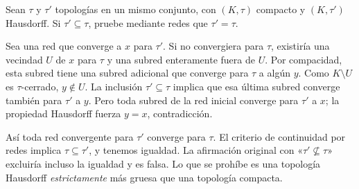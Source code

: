 \begin{ejercicio}\label{ej:v3-l16-1}
Sean $\tau$ y $\tau'$ topologías en un mismo conjunto, con $(K,\tau)$ compacto y $(K,\tau')$ Hausdorff. Si $\tau'\subseteq\tau$, pruebe mediante redes que $\tau'=\tau$.
\end{ejercicio}
\begin{solucion}
Sea una red que converge a $x$ para $\tau'$. Si no convergiera para $\tau$, existiría una vecindad $U$ de $x$ para $\tau$ y una subred enteramente fuera de $U$. Por compacidad, esta subred tiene una subred adicional que converge para $\tau$ a algún $y$. Como $K\setminus U$ es $\tau$-cerrado, $y\notin U$. La inclusión $\tau'\subseteq\tau$ implica que esa última subred converge también para $\tau'$ a $y$. Pero toda subred de la red inicial converge para $\tau'$ a $x$; la propiedad Hausdorff fuerza $y=x$, contradicción.

Así toda red convergente para $\tau'$ converge para $\tau$. El criterio de continuidad por redes implica $\tau\subseteq\tau'$, y tenemos igualdad. La afirmación original con «$\tau'\not\subseteq\tau$» excluiría incluso la igualdad y es falsa. Lo que se prohíbe es una topología Hausdorff \emph{estrictamente} más gruesa que una topología compacta.
\end{solucion}

